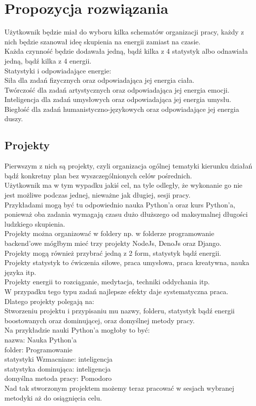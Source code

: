 \documentclass[a4paper,11pt]{report}
\begin{document}
\section {Propozycja rozwiązania}
Użytkownik będzie miał do wyboru kilka schematów organizacji pracy, każdy z nich będzie szanował ideę skupienia na energii zamiast na czasie.
\\Każda czynność będzie dodawała jedną, bądź kilka z 4 statystyk albo odnawiała jedną, bądź kilka z 4 energii.
\\Statystyki i odpowiadające energie:
\\Siła dla zadań fizycznych oraz odpowiadająca jej energia ciała.
\\Twórczość dla zadań artystycznych oraz odpowiadająca jej energia emocji.
\\Inteligencja dla zadań umysłowych oraz odpowiadająca jej energia umysłu.
\\Biegłość dla zadań humanistyczno-językowych oraz odpowiadające jej energia duszy.
\subsection{Projekty}
Pierwszym z nich są projekty, czyli organizacja ogólnej tematyki kierunku działań bądź konkretny plan bez wyszczególnionych celów pośrednich.
\\Użytkownik ma w tym wypadku jakiś cel, na tyle odległy, że wykonanie go nie jest możliwe podczas jednej, nieważne jak długiej, sesji pracy.
\\Przykładami mogą być tu odpowiednio nauka Python'a oraz kurs Python'a, ponieważ oba zadania wymagają czasu dużo dłuższego od maksymalnej długości ludzkiego skupienia.
\\Projekty można organizować w foldery np. w folderze programowanie backend'owe mógłbym mieć trzy projekty NodeJs, DenoJs oraz Django.
\\Projekty mogą również przybrać jedną z 2 form, statystyk bądź energii.
\\Projekty statystyk to  ćwiczenia siłowe, praca umysłowa, praca kreatywna, nauka języka itp.
\\Projekty energii to rozciąganie, medytacja, techniki oddychania itp.
\vspace{0.5cm}
\\W przypadku tego typu zadań najlepsze efekty daje systematyczna praca. Dlatego projekty polegają na:
\\Stworzeniu projektu i przypisaniu mu nazwy, folderu, statystyk bądź energii boostowanych oraz dominującej, oraz domyślnej metody pracy.
\\Na przykładzie nauki Python'a mogłoby to być:
\\nazwa: Nauka Python'a
\\folder: Programowanie
\\statystyki Wzmacniane: inteligencja
\\statystyka dominująca: inteligencja
\\domyślna metoda pracy: Pomodoro
\\Nad tak stworzonym projektem możemy teraz pracować w sesjach wybranej metodyki aż do osiągnięcia celu.
\end{document}

